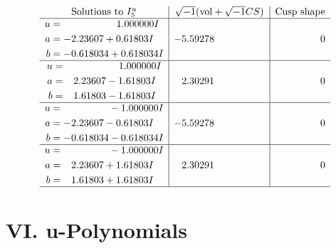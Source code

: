 \documentclass[1p]{elsarticle_modified}
\theoremstyle{definition}
\newcommand{\I}{\sqrt{-1}}
\begin{document}
$$\begin{array}{c|c|c}  
\text{Solutions to }I^u_{5}& \I (\text{vol} + \sqrt{-1}CS) & \text{Cusp shape}\\
 \hline 
\begin{aligned}
u &= \phantom{-0.000000 -}1.000000 I \\
a &= -2.23607 + 0.61803 I \\
b &= -0.618034 + 0.618034 I\end{aligned}
 & -5.59278\phantom{ +0.000000I} & \phantom{-0.000000 } 0 \\ \hline\begin{aligned}
u &= \phantom{-0.000000 -}1.000000 I \\
a &= \phantom{-}2.23607 - 1.61803 I \\
b &= \phantom{-}1.61803 - 1.61803 I\end{aligned}
 & \phantom{-}2.30291\phantom{ +0.000000I} & \phantom{-0.000000 } 0 \\ \hline\begin{aligned}
u &= \phantom{-0.000000 } -1.000000 I \\
a &= -2.23607 - 0.61803 I \\
b &= -0.618034 - 0.618034 I\end{aligned}
 & -5.59278\phantom{ +0.000000I} & \phantom{-0.000000 } 0 \\ \hline\begin{aligned}
u &= \phantom{-0.000000 } -1.000000 I \\
a &= \phantom{-}2.23607 + 1.61803 I \\
b &= \phantom{-}1.61803 + 1.61803 I\end{aligned}
 & \phantom{-}2.30291\phantom{ +0.000000I} & \phantom{-0.000000 } 0\\
 \hline 
 \end{array}$$\newpage
\newpage\renewcommand{\arraystretch}{1}
\centering \section*{ VI. u-Polynomials}
\end{document}
